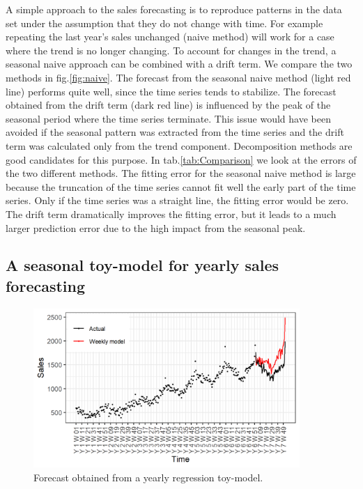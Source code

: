 \documentclass[12pt, letterpaper]{article}\usepackage[]{graphicx}\usepackage[]{color}
\begin{document}
A simple approach to the sales forecasting is to reproduce patterns in the data set under the assumption that they do not change with time. For example repeating the last year's sales unchanged (naive method) will work for a case where the trend is no longer changing. To account for changes in the trend, a seasonal naive approach can be combined with a drift term\cite{Hyndman_book}. We compare the two methods in fig.\ref{fig:naive}. The forecast from the seasonal naive method (light red line) performs quite well, since the time series tends to stabilize. The forecast obtained from the drift term (dark red line) is influenced by the peak of the seasonal period where the time series terminate. This issue would have been avoided if the seasonal pattern was extracted from the time series and the drift term was calculated only from the trend component. Decomposition methods are good candidates for this purpose. In tab.\ref{tab:Comparison} we look at the errors of the two different methods. The fitting error for the seasonal naive method is large because the truncation of the time series cannot fit well the early part of the time series. Only if the time series was a straight line, the fitting error would be zero. The drift term dramatically improves the fitting error, but it leads to a much larger prediction error due to the high impact from the seasonal peak. 

\subsection{A seasonal toy-model for yearly sales forecasting}

\begin{figure}[hb!]
\centering
\includegraphics[width = 0.9\textwidth]{"figures/linear_model.png"}
\caption{Forecast obtained from a yearly regression toy-model.}
\label{fig:linear_model}
\end{figure}
\end{document}
